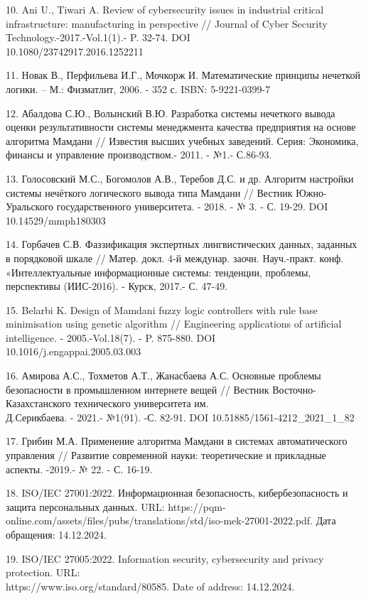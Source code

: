 \begin{references}
10. Ani U., Tiwari A. Review of cybersecurity issues in industrial
critical infrastructure: manufacturing in perspective // Journal of
Cyber Security Technology.-2017.-Vol.1(1).- P. 32-74. DOI\\
10.1080/23742917.2016.1252211

11. Новак В., Перфильева И.Г., Мочкорж И. Математические принципы
нечеткой логики. -- М.: Физматлит, 2006. - 352 с. ISBN: 5-9221-0399-7

12. Абалдова С.Ю., Волынский В.Ю. Разработка системы нечеткого вывода
оценки результативности системы менеджмента качества предприятия на
основе алгоритма Мамдани // Известия высших учебных заведений. Серия:
Экономика, финансы и управление производством.- 2011. - №1.- С.86-93.

13. Голосовский М.С., Богомолов А.В., Теребов Д.С. и др. Алгоритм
настройки системы нечёткого логического вывода типа Мамдани // Вестник
Южно-Уральского государственного университета. - 2018. - № 3. - С.
19-29. DOI 10.14529/mmph180303

14. Горбачев С.В. Фаззификация экспертных лингвистических данных,
заданных в порядковой шкале // Матер. докл. 4-й междунар. заочн.
Науч.-практ. конф. «Интеллектуальные информационные системы: тенденции,
проблемы, перспективы (ИИС-2016). - Курск, 2017.- С. 47-49.

15. Belarbi K. Design of Mamdani fuzzy logic controllers with rule base
minimisation using genetic algorithm // Engineering applications of
artificial intelligence. - 2005.-Vol.18(7). - P. 875-880. DOI\\
10.1016/j.engappai.2005.03.003

16. Амирова А.С., Тохметов А.Т., Жанасбаева А.С. Основные проблемы
безопасности в промышленном интернете вещей // Вестник
Восточно-Казахстанского технического университета им. \\Д.Серикбаева. -
2021.- №1(91). -С. 82-91. DOI 10.51885/1561-4212\_2021\_1\_82

17. Грибин М.А. Применение алгоритма Мамдани в системах автоматического
управления // Развитие современной науки: теоретические и прикладные
аспекты. -2019.- № 22. - С. 16-19.

18. ISO/IEC 27001:2022. Информационная безопасность, кибербезопасность и
защита персональных данных. URL:
https://pqm-online.com/assets/files/pubs/translations/std/iso-mek-27001-2022.pdf.
Дата \\обращения: 14.12.2024.

19. ISO/IEC 27005:2022. Information security, cybersecurity and privacy
protection. URL: \\https://www.iso.org/standard/80585. Date of address:
14.12.2024.


\end{references}
